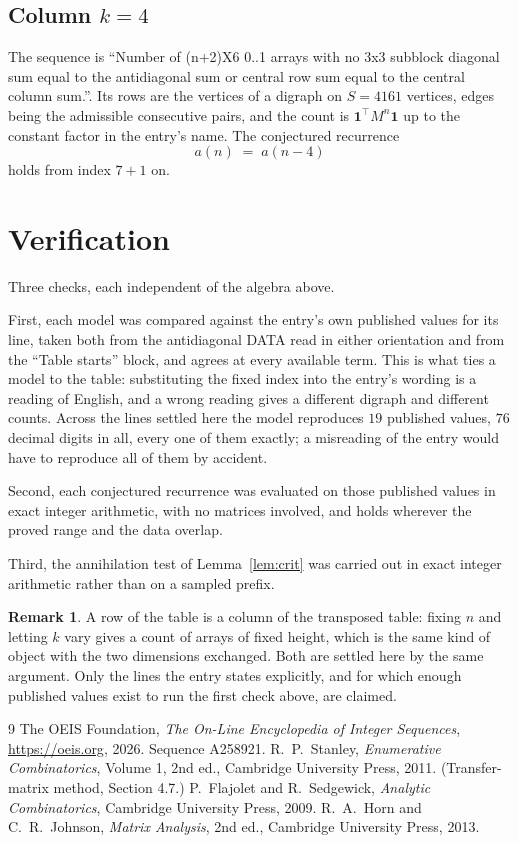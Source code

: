 \documentclass[11pt,a4paper]{article}
\theoremstyle{plain}
\theoremstyle{definition}
\newtheorem{remark}[theorem]{Remark}
\begin{document}
\subsection*{Column $k$$=4$}
The sequence is ``Number of (n+2)X6 0..1 arrays with no 3x3 subblock diagonal sum equal to the antidiagonal sum or central row sum equal to the central column sum.''. Its rows are the vertices of a digraph on
$S=4161$ vertices, edges being the admissible consecutive pairs, and the count is
$\mathbf{1}^{\!\top}M^{n}\mathbf{1}$ up to the constant factor in the entry's name.
The conjectured recurrence
\[
a(n)\;=\;a(n-4)
\]
holds from index $7+1$ on.

\section{Verification}

Three checks, each independent of the algebra above.

First, each model was compared against the entry's own published values for its line, taken
both from the antidiagonal DATA read in either orientation and from the ``Table starts''
block, and agrees at every available term. This is what ties a model to the table:
substituting the fixed index into the entry's wording is a reading of English, and a wrong
reading gives a different digraph and different counts. Across the lines settled here the
model reproduces $19$ published values, $76$ decimal digits in all, every one of
them exactly; a misreading of the entry would have to reproduce all of them by accident.

Second, each conjectured recurrence was evaluated on those published values in exact
integer arithmetic, with no matrices involved, and holds wherever the proved range and the
data overlap.

Third, the annihilation test of Lemma~\ref{lem:crit} was carried out in exact integer
arithmetic rather than on a sampled prefix.

\begin{remark}
A row of the table is a column of the transposed table: fixing $n$ and letting $k$ vary gives a
count of arrays of fixed height, which is the same kind of object with the two dimensions
exchanged. Both are settled here by the same argument. Only the lines the entry states
explicitly, and for which enough published values exist to run the first check above, are
claimed.
\end{remark}

\begin{thebibliography}{9}
 The OEIS Foundation, \emph{The On-Line Encyclopedia of Integer
Sequences}, \url{https://oeis.org}, 2026. Sequence A258921.
 R.~P.~Stanley, \emph{Enumerative Combinatorics}, Volume 1, 2nd ed.,
Cambridge University Press, 2011. (Transfer-matrix method, Section 4.7.)
 P.~Flajolet and R.~Sedgewick, \emph{Analytic Combinatorics}, Cambridge
University Press, 2009.
 R.~A.~Horn and C.~R.~Johnson, \emph{Matrix Analysis}, 2nd ed., Cambridge
University Press, 2013.
\end{thebibliography}
\end{document}
